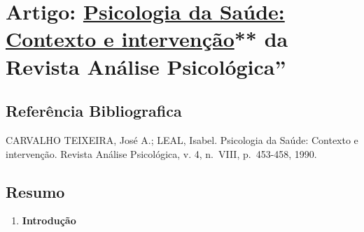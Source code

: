 \documentclass[
]{book}
\providecommand{\tightlist}{%
  \setlength{\itemsep}{0pt}\setlength{\parskip}{0pt}}
\begin{document}
\hypertarget{artigo-psicologia-da-sauxfade-contexto-e-intervenuxe7uxe3o-da-revista-anuxe1lise-psicoluxf3gica}{%
\section{\texorpdfstring{Artigo: \href{https://drive.google.com/file/d/1Xph9Bpk8TS42f-cGZP08vVJ3TLEqK3GZ/view?usp=sharing}{Psicologia da Saúde: Contexto e intervenção}** da Revista \textbf{Análise Psicológica}''}{Artigo: Psicologia da Saúde: Contexto e intervenção** da Revista Análise Psicológica''}}\label{artigo-psicologia-da-sauxfade-contexto-e-intervenuxe7uxe3o-da-revista-anuxe1lise-psicoluxf3gica}}

\hypertarget{referuxeancia-bibliografica}{%
\subsection{Referência Bibliografica}\label{referuxeancia-bibliografica}}

CARVALHO TEIXEIRA, José A.; LEAL, Isabel. Psicologia da Saúde: Contexto e intervenção. Revista Análise Psicológica, v. 4, n.~VIII, p.~453-458, 1990.

\hypertarget{resumo-1}{%
\subsection{Resumo}\label{resumo-1}}

\begin{enumerate}
\def\labelenumi{\arabic{enumi}.}
\tightlist
\item
  \textbf{Introdução}
\end{enumerate}
\end{document}
